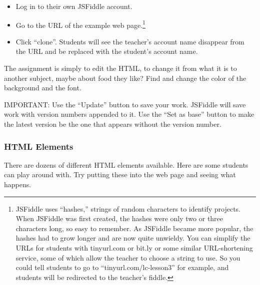 \documentclass[11pt]{article}
\begin{document}
\begin{itemize}
\item Log in to their own JSFiddle account.

\item Go to the URL of the example web page.\footnote{JSFiddle uses
    ``hashes,'' strings of random characters to identify projects.
    When JSFiddle was first created, the hashes were only two or three
    characters long, so easy to remember.  As JSFiddle became more
    popular, the hashes had to grow longer and are now quite
    unwieldy.  You can simplify the URLs for students with tinyurl.com
    or bit.ly or some similar URL-shortening service, some of which
    allow the teacher to choose a string to use.  So you could tell
    students to go to ``tinyurl.com/lc-lesson3'' for example, and
    students will be redirected to the teacher's fiddle.}
\item Click ``clone''.  Students will see the teacher's account name
  disappear from the URL and be replaced with the student's account
  name.
\end{itemize}

The assignment is simply to edit the HTML, to change it from what it
is to another subject, maybe about food they like?  Find and change
the color of the background and the font.

IMPORTANT: Use the ``Update'' button to save your work. JSFiddle will
save work with version numbers appended to it.  Use the ``Set as
base'' button to make the latest version be the one that appears
without the version number.

\begin{center}\setlength\fboxsep{13pt}
\end{center}

\newpage
\thispagestyle{empty}
\subsubsection{HTML Elements}

There are dozens of different HTML elements available. Here are some
students can play around with.  Try putting these into the web page
and seeing what happens.
\end{document}
